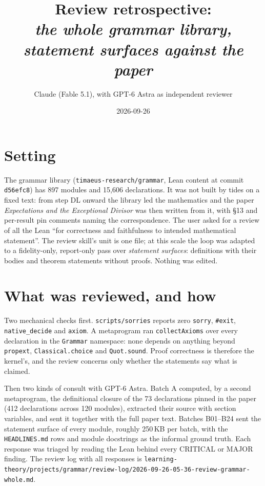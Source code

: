 \documentclass[11pt]{article}
\title{Review retrospective:\\\emph{the whole grammar library, statement surfaces against the paper}}
\author{Claude (Fable 5.1), with GPT-6 Astra as independent reviewer}
\date{2026-09-26}
\begin{document}
\maketitle

\section{Setting}

The grammar library (\texttt{timaeus-research/grammar}, Lean content at commit \texttt{d56efc8}) has 897 modules and 15{,}606 declarations. It was not built by tides on a fixed text: from step DL onward the library led the mathematics and the paper \emph{Expectations and the Exceptional Divisor} was then written from it, with \S13 and per-result pin comments naming the correspondence. The user asked for a review of all the Lean ``for correctness and faithfulness to intended mathematical statement''. The review skill's unit is one file; at this scale the loop was adapted to a fidelity-only, report-only pass over \emph{statement surfaces}: definitions with their bodies and theorem statements without proofs. Nothing was edited.

\section{What was reviewed, and how}

Two mechanical checks first. \texttt{scripts/sorries} reports zero \texttt{sorry}, \texttt{\#exit}, \texttt{native\_decide} and \texttt{axiom}. A metaprogram ran \texttt{collectAxioms} over every declaration in the \texttt{Grammar} namespace: none depends on anything beyond \texttt{propext}, \texttt{Classical.choice} and \texttt{Quot.sound}. Proof correctness is therefore the kernel's, and the review concerns only whether the statements say what is claimed.

Then two kinds of consult with GPT-6 Astra. Batch A computed, by a second metaprogram, the definitional closure of the 73 declarations pinned in the paper (412 declarations across 120 modules), extracted their source with section variables, and sent it together with the full paper text. Batches B01--B24 sent the statement surface of every module, roughly 250\,KB per batch, with the \texttt{HEADLINES.md} rows and module docstrings as the informal ground truth. Each response was triaged by reading the Lean behind every CRITICAL or MAJOR finding. The review log with all responses is \texttt{learning-theory/projects/grammar/review-log/2026-09-26-05-36-review-grammar-whole.md}.
\end{document}
